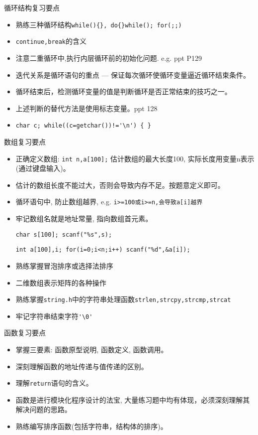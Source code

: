 \begin{frame}[fragile]{循环结构复习要点}
\begin{itemize}
	\item 熟练三种循环结构\lstinline|while(){}, do{}while(); for(;;)|
	\item \lstinline|continue,break|的含义
	\item 注意二重循环中,执行内层循环前的初始化问题. e.g. ppt P129
	\item 迭代关系是循环语句的重点 --- 保证每次循环使循环变量逼近循环结束条件。
	\item 循环结束后，检测循环变量的值是判断循环是否正常结束的技巧之一。
	\item 上述判断的替代方法是使用标志变量。ppt 128
	\item \lstinline|char c; while((c=getchar())!='\n') { }|
\end{itemize}
\end{frame}

\begin{frame}[fragile]{数组复习要点}
\begin{itemize}
	\item 正确定义数组: \lstinline|int n,a[100];| 估计数组的最大长度100, 实际长度用变量n表示(通过键盘输入)。
	\item 估计的数组长度不能过大，否则会导致内存不足。按题意定义即可。
	\item 循环语句中, 防止数组越界, e.g. \lstinline|i>=100或i>=n,会导致a[i]越界|
	\item 牢记数组名就是地址常量, 指向数组首元素。
	
	\lstinline|char s[100]; scanf("%s",s);| 
	
	\lstinline|int a[100],i; for(i=0;i<n;i++) scanf("%d",&a[i]); | 
	\item 熟练掌握冒泡排序或选择法排序
	\item 二维数组表示矩阵的各种操作
	\item 熟练掌握\lstinline|string.h|中的字符串处理函数\lstinline|strlen,strcpy,strcmp,strcat|
	\item 牢记字符串结束字符\lstinline|'\0'|
\end{itemize}
\end{frame}

\begin{frame}{函数复习要点}
\begin{itemize}
	\item 掌握三要素: 函数原型说明, 函数定义, 函数调用。
	\item 深刻理解函数的地址传递与值传递的区别。
	\item 理解\lstinline|return|语句的含义。
	\item 函数是进行模块化程序设计的法宝, 大量练习题中均有体现，必须深刻理解其解决问题的思路。
	\item 熟练编写排序函数(包括字符串，结构体的排序)。
\end{itemize}
\end{frame}

